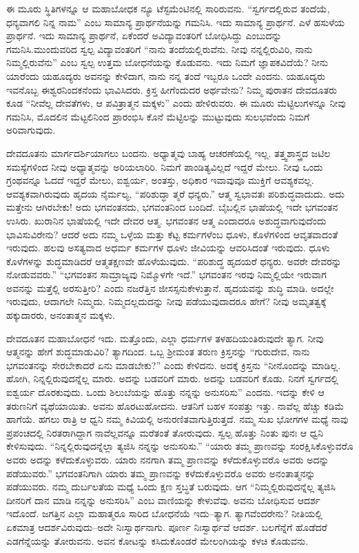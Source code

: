ಈ ಮೂರು ಸ್ಥಿತಿಗಳನ್ನೂ ಆ ಮಹಾಬೋಧಕ ನ್ಯೂ ಟೆಸ್ಟಮೆಂಟಿನಲ್ಲಿ ಸಾರಿರುವನು. “ಸ್ವರ್ಗದಲ್ಲಿರುವ ತಂದೆಯೆ, ಧನ್ಯವಾಗಲಿ ನಿನ್ನ ನಾಮ” ಎಂಬ ಸಾಮಾನ್ಯ ಪ್ರಾರ್ಥನೆಯನ್ನು ಗಮನಿಸಿ. ಇದು ಸಾಮಾನ್ಯ ಪ್ರಾರ್ಥನೆ. ಎಳೆ ಹಸುಳೆಯ ಪ್ರಾರ್ಥನೆ. ಇದು ಸಾಮಾನ್ಯ ಪ್ರಾರ್ಥನೆ, ಏಕೆಂದರೆ ಅವಿದ್ಯಾವಂತರಿಗೆ ಬೋಧಿಸಿದ್ದು ಎಂಬುದನ್ನು ಗಮನಿಸಿ.\break ಮುಂದುವರಿದ ಸ್ವಲ್ಪ ವಿದ್ಯಾವಂತರಿಗೆ “ನಾನು ತಂದೆಯಲ್ಲಿರುವೆನು. ನೀವು ನನ್ನಲ್ಲಿರುವಿರಿ, ನಾನು ನಿಮ್ಮಲ್ಲಿರುವೆನು” ಎಂಬ ಸ್ವಲ್ಪ ಉತ್ತಮ ಬೋಧನೆಯನ್ನು ಕೊಡುವನು. ಇದು ನಿಮಗೆ ಜ್ಞಾಪಕವಿದೆಯೆ? ನೀನು ಯಾರೆಂದು ಯಹೂದ್ಯರು ಅವನನ್ನು ಕೇಳಿದಾಗ, ನಾನು ನನ್ನ ತಂದೆ ಇಬ್ಬರೂ ಒಂದೇ ಎಂದನು. ಯಹೂದ್ಯರು ಇವನೊಬ್ಬ ಈಶ್ವರನಿಂದಕನೆಂದು ಭಾವಿಸಿದರು. ಕ್ರಿಸ್ತ ಹೀಗೆಂದುದರ ಅರ್ಥವೇನು? ನಿಮ್ಮ ಪುರಾತನ ದೇವದೂತರು ಕೂಡ “ನೀವೆಲ್ಲ ದೇವತೆಗಳು, ಆ ಪವಿತ್ರಾತ್ಮನ ಮಕ್ಕಳು” ಎಂದು ಹೇಳಿರುವರು. ಈ ಮೂರು ಮೆಟ್ಟಿಲುಗಳನ್ನೂ ನೀವು ಗಮನಿಸಿ, ಮೊದಲಿನ ಮೆಟ್ಟಲಿನಿಂದ ಪ್ರಾರಂಭಿಸಿ ಕೊನೆ ಮೆಟ್ಟಿಲನ್ನು ಮುಟ್ಟುವುದು ಸುಲಭವೆಂದು ನಿಮಗೆ ಅರಿವಾಗುವುದು.

ದೇವದೂತನು ಮಾರ್ಗದರ್ಶಿಯಾಗಲು ಬಂದನು. ಅಧ್ಯಾತ್ಮವು ಬಾಹ್ಯ ಆಚರಣೆಯಲ್ಲಿ ಇಲ್ಲ. ತತ್ತ್ವಶಾಸ್ತ್ರದ ಜಟಿಲ ಸಮಸ್ಯೆಗಳಿಂದ ನೀವು ಅಧ್ಯಾತ್ಮವನ್ನು ಅರಿಯಲಾರಿರಿ. ನಿಮಗೆ ಪಾಂಡಿತ್ಯವಿಲ್ಲದೆ ಇದ್ದರೆ ಮೇಲು. ನೀವು ಒಂದು ಗ್ರಂಥವನ್ನೂ ಓದದೆ ಇದ್ದರೆ ಮೇಲು, ಐಶ್ವರ್ಯ, ಅಂತಸ್ತು, ಅಧಿಕಾರ ಇವಾವುವೂ ಮುಕ್ತಿಗೆ ಆವಶ್ಯಕವಲ್ಲ. ಆವಶ್ಯಕ\-ವಾಗಿರುವುದು ಹೃದಯ ನೈರ್ಮಲ್ಯ, “ಪರಿಶುದ್ಧಾ ತ್ಮರೆ ಧನ್ಯರು.” ಆತ್ಮ ಸ್ವಭಾವತಃ ಪರಿಶುದ್ಧ\-ವಾದುದು. ಅದು ಮತ್ತೇನು ಆಗಿರಬೇಕು! ಅದು ಭಗವಂತನದು, ಭಗವಂತನಿಂದ ಬಂದಿದೆ. ಬೈಬಲ್ಲಿನ ಭಾಷೆಯಲ್ಲಿ ಇದೇ ಭಗವಂತನ ಉಸಿರು. ಖುರಾನಿನ ಭಾಷೆಯಲ್ಲಿ ಇದೇ ದೇವರ ಆತ್ಮ. ಭಗವಂತನ ಆತ್ಮ ಎಂದಾದರೂ ಅಶುದ್ಧವಾಗುವುದೆಂದು ಭಾವಿಸುವಿ\-ರೇನು? ಆದರೆ ಅದು ನಮ್ಮ ಒಳ್ಳೆಯ ಮತ್ತು ಕೆಟ್ಟ ಕರ್ಮಗಳೆಂಬ ಧೂಳು, ಕೊಳೆಗಳಿಂದ ಆವೃತ\-ವಾದಂತೆ ಇರುವುದು. ಹಲವು ಅಸತ್ಯವಾದ ಅಧರ್ಮ ಕರ್ಮಗಳ ಧೂಳು ಜೀವಿಯನ್ನು ಆವರಿಸಿದಂತೆ ಇರುವುದು. ಧೂಳು ಕೊಳೆಗಳನ್ನು ಶುದ್ಧಮಾಡಿದರೆ ಆತ್ಮ\break ತಕ್ಷಣವೇ ಹೊಳೆಯುವುದು. “ಪರಿಶುದ್ಧ ಹೃದಯರೆ ಧನ್ಯರು. ಅವರೇ ದೇವರನ್ನು ನೋಡುವವರು.” “ಭಗವಂತನ ಸಾಮ್ರಾಜ್ಯವು ನಿಮ್ಮೊಳಗೇ ಇದೆ.” ಭಗವಂತನ ಇರವು ನಿಮ್ಮಲ್ಲಿಯೇ ಇರುವಾಗ ಅವನನ್ನು ಮತ್ತೆಲ್ಲಿ ಅರಸುತ್ತೀರಿ? ಎಂದು ನಜರೆತ್ತಿನ ಜೀಸಸ್ಸನು\break ಕೇಳುತ್ತಾನೆ. ಹೃದಯವನ್ನು ಶುದ್ಧಿ ಮಾಡಿ. ಅದಲ್ಲೇ ಇರುವುದು, ಆದಾಗಲೇ ನಿಮ್ಮದು. ನಿಮ್ಮದಲ್ಲದುದನ್ನು ನೀವು ಪಡೆಯುವುದಾದರೂ ಹೇಗೆ? ನೀವು ಅಮೃತತ್ವಕ್ಕೆ ಹಕ್ಕು\-ದಾರರು, ಅನಂತಾತ್ಮನ ಮಕ್ಕಳು.

ದೇವದೂತನ ಮಹಾಬೋಧನೆ ಇದು. ಮತ್ತೊಂದು, ಎಲ್ಲಾ ಧರ್ಮಗಳ ತಳಹದಿಯಂತಿರುವುದೇ ತ್ಯಾಗ. ನೀವು ಆತ್ಮನನ್ನು ಹೇಗೆ ಶುದ್ಧಮಾಡುವಿರಿ? ತ್ಯಾಗದಿಂದ. ಒಬ್ಬ ಶ‍್ರೀಮಂತ ತರುಣ ಕ್ರಿಸ್ತನನ್ನು “ಗುರುದೇವ, ನಾನು ಭಗವಂತನನ್ನು ಸೇರಬೇಕಾದರೆ ಏನು ಮಾಡಬೇಕು?” ಎಂದು ಕೇಳಿದನು. ಅದಕ್ಕೆ ಕ್ರಿಸ್ತನು “ನೀನೊಂದನ್ನು ಮಾಡಿಲ್ಲ. ಹೋಗಿ, ನಿನ್ನಲ್ಲಿರುವುದನ್ನೆಲ್ಲ ಮಾರು. ಅದನ್ನು ಬಡವರಿಗೆ ಮಾರು. ಅದನ್ನು ಬಡವರಿಗೆ ಕೊಡು. ನಿನಗೆ ಸ್ವರ್ಗದಲ್ಲಿ ಐಶ್ವರ್ಯ ದೊರಕುವುದು. ಒಂದು ಶಿಲುಬೆಯನ್ನು ಹೊತ್ತು ನನ್ನನ್ನು ಅನುಸರಿಸು” ಎಂದನು. ಇದನ್ನು ಕೇಳಿ ಆ ತರುಣನಿಗೆ ವ್ಯಥೆ\-ಯಾಯಿತು. ಅವನು ಹೊರಟುಹೋದನು. ಆತನಿಗೆ ಬಹಳ ಸಂಪತ್ತು ಇತ್ತು. ನಾವೆಲ್ಲ ಹೆಚ್ಚು ಕಡಿಮೆ ಹಾಗೆಯೆ. ಹಗಲು ರಾತ್ರಿ ಆ ಧ್ವನಿ ನಮ್ಮ ಕಿವಿಯಲ್ಲಿ ಅನುರಣಿತವಾಗುತ್ತಿರುತ್ತದೆ. ನಮ್ಮ ಸುಖ ಭೋಗಗಳ ಮಧ್ಯೆ ನಾವು ಪ್ರಪಂಚದಲ್ಲಿ ನಿರತರಾಗಿದ್ದಾಗ ನಾವೆಲ್ಲವನ್ನೂ ಮರೆತಂತೆ ತೋರುವುದು. ಸ್ವಲ್ಪ ಹೊತ್ತು ನಿಂತು ಪುನಃ ಆ ಧ್ವನಿ ಕೇಳಿಸುವುದು. “ನಿನ್ನಲ್ಲಿರುವುದನ್ನೆಲ್ಲಾ ತ್ಯಜಿಸಿ ನನ್ನನ್ನು ಅನುಸರಿಸು.” “ಯಾರು ತಮ್ಮ ಪ್ರಾಣವನ್ನು ಸಂರಕ್ಷಿಸಿಕೊಳ್ಳುವರೊ ಅವರು ಅದನ್ನು ಕಳೆದುಕೊಳ್ಳುವರು. ಯಾರು ನನಗಾಗಿ ತಮ್ಮ ಪ್ರಾಣವನ್ನು ಕಳೆದುಕೊಳ್ಳುವರೊ ಅವರು ಅದನ್ನು ಪಡೆಯುವರು.” ಭಗವಂತನಿಗಾಗಿ ಯಾರು ತಮ್ಮ ಪ್ರಾಣವನ್ನು ಕಳೆದು\-ಕೊಳ್ಳುವರೊ ಅವರು ಅನಂತಾತ್ಮನನ್ನು ಪಡೆಯುವರು. ನಮ್ಮ ದುರ್ಬಲತೆಯ ಮಧ್ಯೆ ಒಂದು ಕ್ಷಣ ಸ್ತಬ್ಧತೆ ಬರುವುದು. ಆಗ “ನಿಮ್ಮಲ್ಲಿರುವುದನ್ನೆಲ್ಲ ತ್ಯಜಿಸಿ ದೀನರಿಗೆ ದಾನ ಮಾಡಿ ನನ್ನನ್ನು ಅನುಸರಿಸಿ” ಎಂಬ ವಾಣಿಯನ್ನು ಕೇಳುವೆವು. ಅವನು ಬೋಧಿಸುವ ಆದರ್ಶ ಇದೊಂದೆ. ಜಗತ್ತಿನ ಎಲ್ಲಾ ಮಹಾತ್ಮರೂ ಸಾರಿದ ಬೋಧನೆಯೆ ಇದು–ತ್ಯಾಗ. ತ್ಯಾಗವೆಂದರೇನು? ನೀತಿಯಲ್ಲಿ ಏಕಮಾತ್ರ ಆದರ್ಶವಿರುವುದು–ಅದೇ ನಿಃಸ್ವಾರ್ಥನಾಗು. ಪೂರ್ಣ ನಿಃಸ್ವಾರ್ಥವೆ ಆದರ್ಶ. ಬಲಗೆನ್ನೆಗೆ ಹೊಡೆದರೆ ಎಡಗೆನ್ನೆಯನ್ನು ತೋರುವನು. ಅವನ ಕೋಟನ್ನು ಕಸಿದುಕೊಂಡರೆ ಮೇಲಂಗಿಯನ್ನು ಕಳಚಿ ಕೊಡುವನು.

